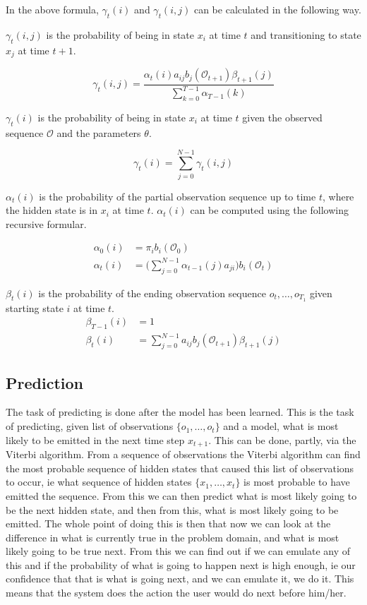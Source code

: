 In the above formula, $\gamma_t(i)$ and $\gamma_t(i, j)$ can be calculated in the following way.

$\gamma_t(i, j)$ is the probability of being in state $x_i$ at time $t$ and transitioning to state $x_j$ at time $t+1$.

\begin{equation*}
\gamma_t(i,j) = \frac { \alpha_t(i) a_{ij} b_j(\mathcal{O}_{t+1}) \beta_{t+1}(j) } { \sum\limits_{k=0}^{T-1} \alpha_{T-1}(k) }
\end{equation*}

$\gamma_t(i)$ is the probability of being in state $x_i$ at time $t$ given the observed sequence $\mathcal{O}$ and the parameters $\theta$.

\begin{equation*}
\gamma_t(i) = \sum\limits_{j=0}^{N-1} \gamma_t(i,j)
\end{equation*}

$\alpha_t(i)$ is the probability of the partial observation sequence up to time $t$, where the hidden state is in $x_i$ at time $t$. $\alpha_t(i)$ can be computed using the following recursive formular.

\begin{align*}
\alpha_0(i) &= \pi_i b_i(\mathcal{O}_0) \\
\alpha_t(i) &= \Bigg( \sum\limits_{j=0}^{N-1} \alpha_{t-1}(j) a_{ji} \Bigg) b_i(\mathcal{O}_t)
\end{align*}

$\beta_t(i)$ is the probability of the ending observation sequence $o_t,\ldots,o_{T_1}$ given starting state $i$ at time $t$.
\begin{align*}
\beta_{T-1}(i) &= 1 \\
\beta_t(i) &= \sum\limits_{j=0}^{N-1} a_{ij} b_j(\mathcal{O}_{t+1}) \beta_{t+1}(j)
\end{align*}


\subsection{Prediction}\label{sub:Prediction}
The task of predicting is done after the model has been learned. This is the task of predicting, given list of observations $\{o_1,\dots,o_t\}$ and a model, what is most likely to be emitted in the next time step $x_{t+1}$. This can be done, partly, via the Viterbi algorithm. From a sequence of observations the Viterbi algorithm can find the most probable sequence of hidden states that caused this list of observations to occur, ie what sequence of hidden states $\{x_1,\dots,x_t\}$ is most probable to have emitted the sequence. From this we can then predict what is most likely going to be the next hidden state, and then from this, what is most likely going to be emitted. The whole point of doing this is then that now we can look at the difference in what is currently true in the problem domain, and what is most likely going to be true next. From this we can find out if we can emulate any of this and if the probability of what is going to happen next is high enough, ie our confidence that that is what is going next, and we can emulate it, we do it. This means that the system does the action the user would do next before him/her.
